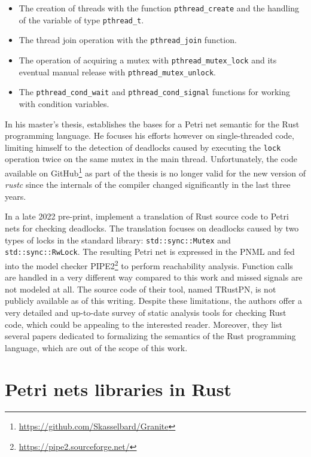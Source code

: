 \documentclass[../Thesis.tex]{subfiles}
\begin{document}
\begin{itemize}
      \item The creation of threads with the function \texttt{pthread\_create}
            and the handling of the variable of type \texttt{pthread\_t}.
      \item The thread join operation with the \texttt{pthread\_join} function.
      \item The operation of acquiring a mutex with \texttt{pthread\_mutex\_lock}
            and its eventual manual release with \texttt{pthread\_mutex\_unlock}.
      \item The \texttt{pthread\_cond\_wait} and \texttt{pthread\_cond\_signal} functions
            for working with condition variables.
\end{itemize}

In his master's thesis, \cite{meyer2020} establishes
the bases for a Petri net semantic for the Rust programming language.
He focuses his efforts however on single-threaded code,
limiting himself to the detection of deadlocks caused by
executing the \texttt{lock} operation twice on the same mutex in the main thread.
Unfortunately, the code available on GitHub\footnote{\url{https://github.com/Skasselbard/Granite}}
as part of the thesis is no longer valid for the new version of \emph{rustc}
since the internals of the compiler changed significantly in the last three years.

In a late 2022 pre-print, \cite{zhang2022deadlocks} implement a translation
of Rust source code to Petri nets for checking deadlocks.
The translation focuses on deadlocks caused by two types of locks
in the standard library: \texttt{std::sync::Mutex} and \texttt{std::sync::RwLock}.
The resulting Petri net is expressed in the \acrfull{PNML}
and fed into the model checker \acrfull{PIPE2}\footnote{\url{https://pipe2.sourceforge.net/}}
to perform reachability analysis.
Function calls are handled in a very different way compared to this work and
missed signals are not modeled at all.
The source code of their tool, named TRustPN, is not publicly available as of this writing.
Despite these limitations, the authors offer a very detailed and up-to-date survey
of static analysis tools for checking Rust code,
which could be appealing to the interested reader.
Moreover, they list several papers dedicated to
formalizing the semantics of the Rust programming language,
which are out of the scope of this work.

\section{Petri nets libraries in Rust}
\end{document}
